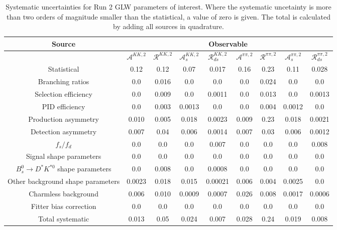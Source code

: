 \begin{sidewaystable}
  \centering
  \begin{tabular}{ccccccccc}
      \toprule
      Source & \multicolumn{8}{c}{Observable} \\
      \midrule
       & $\mathcal{A}^{KK,2}$ & $\mathcal{R}^{KK,2}$ & $\mathcal{A}_s^{KK,2}$ & $\mathcal{R}_{ds}^{KK,2}$ & $\mathcal{A}^{\pi\pi,2}$ & $\mathcal{R}^{\pi\pi,2}$ & $\mathcal{A}_s^{\pi\pi,2}$ & $\mathcal{R}_{ds}^{\pi\pi,2}$ \\
      \midrule
      Statistical & 0.12 & 0.12 & 0.07 & 0.017 & 0.16 & 0.23 & 0.11 & 0.028 \\
      \midrule
      Branching ratios & 0.0  & 0.016 & 0.0  & 0.0  & 0.0  & 0.024 & 0.0  & 0.0  \\
      Selection efficiency & 0.0  & 0.009 & 0.0  & 0.0011 & 0.0  & 0.013 & 0.0  & 0.0013 \\
      PID efficiency & 0.0  & 0.003 & 0.0013 & 0.0  & 0.0  & 0.004 & 0.0012 & 0.0  \\
      Production asymmetry & 0.010 & 0.005 & 0.018 & 0.0023 & 0.009 & 0.23 & 0.018 & 0.0021 \\
      Detection asymmetry & 0.007 & 0.04 & 0.006 & 0.0014 & 0.007 & 0.03 & 0.006 & 0.0012 \\
      $f_s/f_d$ & 0.0  & 0.0  & 0.0  & 0.007 & 0.0  & 0.0  & 0.0  & 0.008 \\
      Signal shape parameters & 0.0  & 0.0  & 0.0  & 0.0  & 0.0  & 0.0  & 0.0  & 0.0  \\
      $B^0_s \to D^* K^{*0}$ shape parameters & 0.0  & 0.008 & 0.0  & 0.0008 & 0.0  & 0.0  & 0.0  & 0.0  \\
      Other background shape parameters & 0.0023 & 0.018 & 0.015 & 0.00021 & 0.006 & 0.004 & 0.0025 & 0.0  \\
      Charmless background & 0.006 & 0.010 & 0.0009 & 0.0007 & 0.026 & 0.008 & 0.0017 & 0.0006 \\
      Fitter bias correction & 0.0  & 0.0  & 0.0  & 0.0  & 0.0  & 0.0  & 0.0  & 0.0  \\
      \midrule
      Total systematic & 0.013 & 0.05 & 0.024 & 0.007 & 0.028 & 0.24 & 0.019 & 0.008 \\
      \bottomrule
  \end{tabular}
  \caption{Systematic uncertainties for Run 2 GLW parameters of interest. Where the systematic uncetainty is more than two orders of magnitude smaller than the statistical, a value of zero is given. The total is calculated by adding all sources in quadrature.}
\label{tab:KK_run2_systematics}
\end{sidewaystable}
